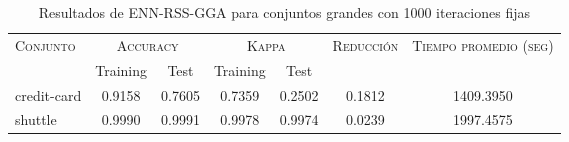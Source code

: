 \begin{table}[]
\centering
\begin{tabular}{l c c c c c c}
\hline
\multirow{2}{*}{\textsc{Conjunto}}
	& \multicolumn{2}{c}{\textsc{Accuracy}}
	& \multicolumn{2}{c}{\textsc{Kappa}}
	& \textsc{Reducción}
	& \textsc{Tiempo promedio (seg)} \\
	& Training & Test
	& Training & Test \\ 
\hline
\hline

credit-card & 0.9158 & 0.7605 & 0.7359 & 0.2502 & 0.1812 & 1409.3950  \\
shuttle & 0.9990 & 0.9991 & 0.9978 & 0.9974 & 0.0239 & 1997.4575 \\

\hline
\end{tabular}
\caption{Resultados de ENN-RSS-GGA para conjuntos grandes con 1000 iteraciones fijas}
\label{res-grande-enn-rss-gga}
\end{table}

\clearpage


